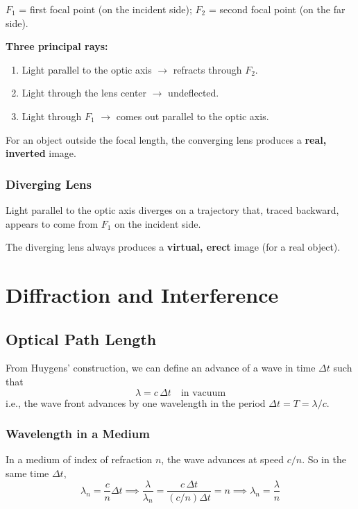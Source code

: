 \documentclass[11pt]{report}
\begin{document}
$F_1$ = first focal point (on the incident side); $F_2$ = second focal point (on the far side).

\textbf{Three principal rays:}
\begin{enumerate}
    \item Light parallel to the optic axis $\to$ refracts through $F_2$.
    \item Light through the lens center $\to$ undeflected.
    \item Light through $F_1$ $\to$ comes out parallel to the optic axis.
\end{enumerate}

For an object outside the focal length, the converging lens produces a \textbf{real, inverted} image.

\subsection*{Diverging Lens}

Light parallel to the optic axis diverges on a trajectory that, traced backward, appears to come from $F_1$ on the incident side.

The diverging lens always produces a \textbf{virtual, erect} image (for a real object).


\newpage
\chapter{Diffraction and Interference}

\section{Optical Path Length}

From Huygens' construction, we can define an advance of a wave in time $\Delta t$ such that
\begin{equation}
\lambda = c\,\Delta t \quad \text{in vacuum}
\end{equation}
i.e., the wave front advances by one wavelength in the period $\Delta t = T = \lambda/c$.

\subsection*{Wavelength in a Medium}

In a medium of index of refraction $n$, the wave advances at speed $c/n$. So in the same time $\Delta t$,
\begin{equation}
\lambda_n = \frac{c}{n}\Delta t \implies \frac{\lambda}{\lambda_n} = \frac{c\,\Delta t}{(c/n)\Delta t} = n \implies \boxed{\lambda_n = \frac{\lambda}{n}}
\end{equation}
\end{document}
